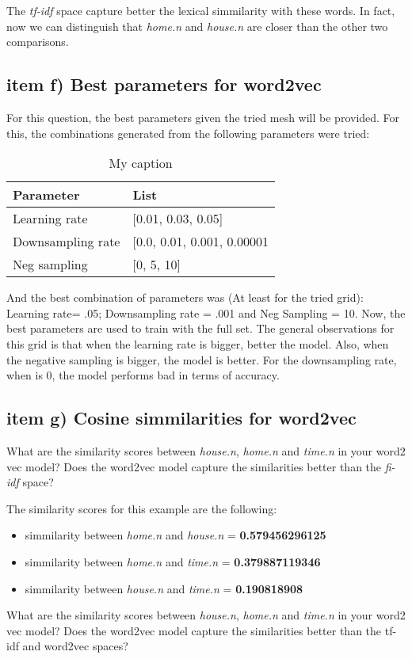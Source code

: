 \documentclass{article}
\begin{document}
The \textit{tf-idf} space capture better the lexical simmilarity with these words. In fact, now we can distinguish that \textit{home.n} and \textit{house.n} are closer than the other two comparisons.

\subsection{item f) Best parameters for word2vec}

For this question, the best parameters given the tried mesh will be provided. For this, the combinations generated from the following parameters were tried:

\begin{table}[ht!]
\centering
\caption{My caption}
\label{my-label}
\begin{tabular}{|l|l|}
\hline
Parameter         & List                         \\ \hline
Learning rate     & {[}0.01, 0.03, 0.05{]}       \\
Downsampling rate & {[}0.0, 0.01, 0.001, 0.00001 \\
Neg sampling      & {[}0, 5, 10{]}               \\ \hline
\end{tabular}
\end{table}

And the best combination of parameters was (At least for the tried grid): Learning rate= .05; Downsampling rate = .001 and Neg Sampling = 10. Now, the best parameters are used to train with the full set. The general observations for this grid is that when the learning rate is bigger, better the model. Also, when the negative sampling is bigger, the model is better. For the downsampling rate, when is 0, the model performs bad in terms of accuracy.

\subsection{item g) Cosine simmilarities for word2vec}
What are the similarity scores between \textit{house.n}, \textit{home.n} and \textit{time.n} in your word2 vec model? Does the word2vec model capture the similarities better than the \textit{fi-idf} space?

The similarity scores for this example are the following:
\begin{itemize}
\item{simmilarity between \textit{home.n} and \textit{house.n} = \textbf{0.579456296125}}
\item{simmilarity between \textit{home.n} and \textit{time.n} = \textbf{0.379887119346}} 
\item{simmilarity between \textit{house.n} and \textit{time.n} = \textbf{0.190818908}} 
\end{itemize}
What are the similarity scores between \textit{house.n}, \textit{home.n} and \textit{time.n} in your word2 vec model? Does the word2vec model capture the similarities better than the tf-idf and word2vec spaces?
\end{document}
